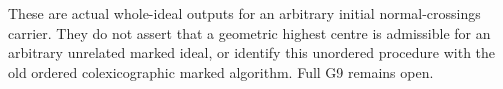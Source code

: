 \begin{remark}
These are actual whole-ideal outputs for an arbitrary initial normal-crossings
carrier. They do not assert that a geometric highest centre is admissible for
an arbitrary unrelated marked ideal, or identify this unordered procedure with
the old ordered colexicographic marked algorithm. Full G9 remains open.
\end{remark}
